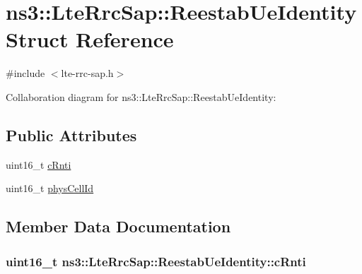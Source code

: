 \hypertarget{structns3_1_1LteRrcSap_1_1ReestabUeIdentity}{}\section{ns3\+:\+:Lte\+Rrc\+Sap\+:\+:Reestab\+Ue\+Identity Struct Reference}
\label{structns3_1_1LteRrcSap_1_1ReestabUeIdentity}


{\ttfamily \#include $<$lte-\/rrc-\/sap.\+h$>$}



Collaboration diagram for ns3\+:\+:Lte\+Rrc\+Sap\+:\+:Reestab\+Ue\+Identity\+:
\subsection*{Public Attributes}
\begin{DoxyCompactItemize}
\item 
uint16\+\_\+t \hyperlink{structns3_1_1LteRrcSap_1_1ReestabUeIdentity_aa5bbd6336e92bf028cb8841e6669f9e6}{c\+Rnti}
\item 
uint16\+\_\+t \hyperlink{structns3_1_1LteRrcSap_1_1ReestabUeIdentity_a90790c6986fc2f29df81220832eb4834}{phys\+Cell\+Id}
\end{DoxyCompactItemize}


\subsection{Member Data Documentation}
\subsubsection[{\texorpdfstring{c\+Rnti}{cRnti}}]{\setlength{\rightskip}{0pt plus 5cm}uint16\+\_\+t ns3\+::\+Lte\+Rrc\+Sap\+::\+Reestab\+Ue\+Identity\+::c\+Rnti}\hypertarget{structns3_1_1LteRrcSap_1_1ReestabUeIdentity_aa5bbd6336e92bf028cb8841e6669f9e6}{}\label{structns3_1_1LteRrcSap_1_1ReestabUeIdentity_aa5bbd6336e92bf028cb8841e6669f9e6}
